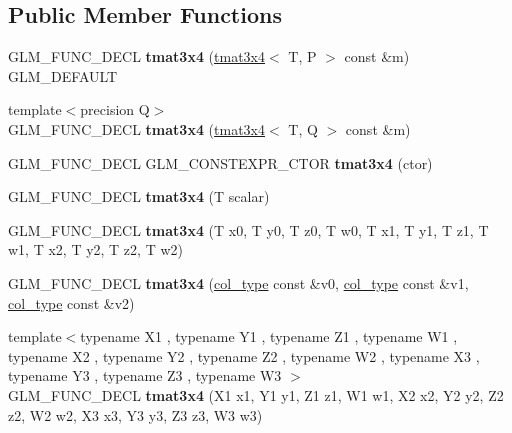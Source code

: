 \subsection*{Public Member Functions}
\begin{DoxyCompactItemize}
\item 
\mbox{\label{structglm_1_1tmat3x4_ab424019515d481478f47bac3d055f621}} 
G\+L\+M\+\_\+\+F\+U\+N\+C\+\_\+\+D\+E\+CL {\bfseries tmat3x4} (\hyperlink{structglm_1_1tmat3x4}{tmat3x4}$<$ T, P $>$ const \&m) G\+L\+M\+\_\+\+D\+E\+F\+A\+U\+LT
\item 
\mbox{\label{structglm_1_1tmat3x4_a7bb59eb4a55a89437df372f9cc6389e1}} 
{\footnotesize template$<$precision Q$>$ }\\G\+L\+M\+\_\+\+F\+U\+N\+C\+\_\+\+D\+E\+CL {\bfseries tmat3x4} (\hyperlink{structglm_1_1tmat3x4}{tmat3x4}$<$ T, Q $>$ const \&m)
\item 
\mbox{\label{structglm_1_1tmat3x4_a930782f1f709278737022337bd839e66}} 
G\+L\+M\+\_\+\+F\+U\+N\+C\+\_\+\+D\+E\+CL G\+L\+M\+\_\+\+C\+O\+N\+S\+T\+E\+X\+P\+R\+\_\+\+C\+T\+OR {\bfseries tmat3x4} (ctor)
\item 
\mbox{\label{structglm_1_1tmat3x4_a3a0ca2bde86e5e84185ae755d97f5f34}} 
G\+L\+M\+\_\+\+F\+U\+N\+C\+\_\+\+D\+E\+CL {\bfseries tmat3x4} (T scalar)
\item 
\mbox{\label{structglm_1_1tmat3x4_a34d8a86482525e5100dea559991bba2e}} 
G\+L\+M\+\_\+\+F\+U\+N\+C\+\_\+\+D\+E\+CL {\bfseries tmat3x4} (T x0, T y0, T z0, T w0, T x1, T y1, T z1, T w1, T x2, T y2, T z2, T w2)
\item 
\mbox{\label{structglm_1_1tmat3x4_a80f60a03121cb766e5397ab56ac3e356}} 
G\+L\+M\+\_\+\+F\+U\+N\+C\+\_\+\+D\+E\+CL {\bfseries tmat3x4} (\hyperlink{structglm_1_1tvec4}{col\+\_\+type} const \&v0, \hyperlink{structglm_1_1tvec4}{col\+\_\+type} const \&v1, \hyperlink{structglm_1_1tvec4}{col\+\_\+type} const \&v2)
\item 
\mbox{\label{structglm_1_1tmat3x4_aa797d8de2ec5784a9e29776f66998c9f}} 
{\footnotesize template$<$typename X1 , typename Y1 , typename Z1 , typename W1 , typename X2 , typename Y2 , typename Z2 , typename W2 , typename X3 , typename Y3 , typename Z3 , typename W3 $>$ }\\G\+L\+M\+\_\+\+F\+U\+N\+C\+\_\+\+D\+E\+CL {\bfseries tmat3x4} (X1 x1, Y1 y1, Z1 z1, W1 w1, X2 x2, Y2 y2, Z2 z2, W2 w2, X3 x3, Y3 y3, Z3 z3, W3 w3)

\end{DoxyCompactItemize}
